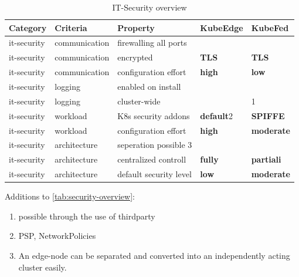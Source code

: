 \documentclass[MSC,Master,english]{twbook}%
\newcommand{\cmark}{\ding{51}}%
\newcommand{\xmark}{\ding{55}}%
\begin{document}
\begin{table}[ht]
    \begin{center}
        \begin{tabular}{|l|l|l|l|l|}
            \hline
            Category & Criteria & Property & \textbf{KubeEdge} & \textbf{KubeFed} \\
            \hline
            it-security & communication & firewalling all ports & \cmark & \xmark \\
            it-security & communication & encrypted & \textbf{TLS} & \textbf{TLS} \\
            it-security & communication & configuration effort & \textbf{high} & \textbf{low} \\
            it-security & logging & enabled on install & \xmark & \cmark \\
            it-security & logging & cluster-wide & \cmark & \xmark \tiny{1} \\
            it-security & workload & K8s security addons & \textbf{default}\tiny{2} & \textbf{SPIFFE} \cite{ke-secure-fw} \\
            it-security & workload & configuration effort & \textbf{high} & \textbf{moderate} \\
            it-security & architecture & seperation possible \tiny{3} & \xmark & \cmark \\
            it-security & architecture & centralized controll & \textbf{fully} & \textbf{partiali} \\
            it-security & architecture & default security level & \textbf{low} & \textbf{moderate} \\           
            \hline
        \end{tabular}
        \caption{IT-Security overview}
        \label{tab:security-overview}
    \end{center}
\end{table}

Additions to \autoref{tab:security-overview}:
\begin{enumerate}
    \itemsep0em
    \item possible through the use of thirdparty
    \item \ac{PSP}, NetworkPolicies
    \item An edge-node can be separated and converted into an independently acting cluster easily.
\end{enumerate}
\end{document}
